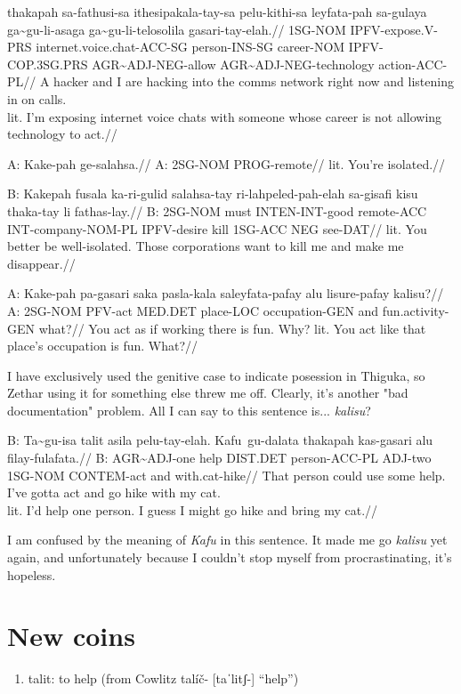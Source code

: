 \documentclass{thiguka}
\begin{document}
\ex
\begingl
\gla thakapah sa-fathusi-sa ithesipakala-tay-sa pelu-kithi-sa leyfata-pah sa-gulaya ga\~{}gu-li-asaga ga\~{}gu-li-telosolila gasari-tay-elah.//
\glb 1SG-NOM IPFV-expose.V-PRS internet.voice.chat-ACC-SG person-INS-SG career-NOM IPFV-COP.3SG.PRS AGR\~{}ADJ-NEG-allow AGR\~{}ADJ-NEG-technology action-ACC-PL//
\glft A hacker and I are hacking into the comms network right now and listening in on calls.\\
      lit. I'm exposing internet voice chats with someone whose career is not allowing technology to act.//
\endgl
\xe

\ex
\begingl
\gla A: Kake-pah ge-salahsa.//
\glb A: 2SG-NOM PROG-remote//
\glft lit. You're isolated.//
\endgl
\xe

\ex
\begingl
\gla B: Kakepah fusala ka-ri-gulid salahsa-tay ri-lahpeled-pah-elah sa-gisafi kisu thaka-tay li fathas-lay.//
\glb B: 2SG-NOM must INTEN-INT-good remote-ACC INT-company-NOM-PL IPFV-desire kill 1SG-ACC NEG see-DAT//
\glft lit. You better be well-isolated. Those corporations want to kill me and make me disappear.//
\endgl
\xe

\ex
\begingl
\gla A: Kake-pah pa-gasari saka pasla-kala saleyfata-pafay alu lisure-pafay kalisu?//
\glb A: 2SG-NOM PFV-act MED.DET place-LOC occupation-GEN and fun.activity-GEN what?//
\glft You act as if working there is fun. Why?
      lit. You act like that place's occupation is fun. What?//
\endgl
\xe

I have exclusively used the genitive case to indicate posession in Thiguka, so Zethar using it for something else threw me off.
Clearly, it's another "bad documentation" problem.
All I can say to this sentence is... \textit{kalisu}?

\ex
\begingl
\gla B: Ta\~{}gu-isa talit asila pelu-tay-elah. Kafu~gu-dalata thakapah kas-gasari alu filay-fulafata.//
\glb B: AGR\~{}ADJ-one help DIST.DET person-ACC-PL ADJ-two 1SG-NOM CONTEM-act and with.cat-hike//
\glft That person could use some help. I've gotta act and go hike with my cat.\\
      lit. I'd help one person. I guess I might go hike and bring my cat.//
\endgl
\xe

I am confused by the meaning of \textit{Kafu} in this sentence.
It made me go \textit{kalisu} yet again, and unfortunately because I couldn't stop myself from procrastinating, it's hopeless.


\section{New coins}
\begin{enumerate}
    \item talit: to help (from Cowlitz talíč- [taˈlitʃ-] “help”)
\end{enumerate}
\end{document}
